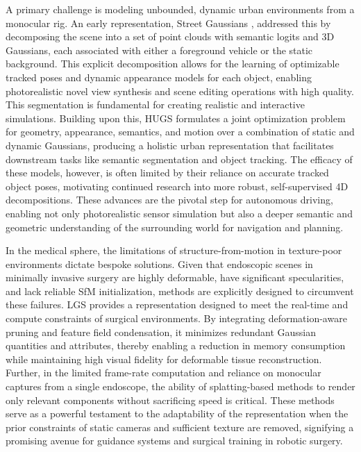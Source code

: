 \documentclass[11pt,a4paper]{article}
\begin{document}
A primary challenge is modeling unbounded, dynamic urban environments from a monocular rig. An early representation, Street Gaussians \cite{arxiv:2401.01339v1}, addressed this by decomposing the scene into a set of point clouds with semantic logits and 3D Gaussians, each associated with either a foreground vehicle or the static background. This explicit decomposition allows for the learning of optimizable tracked poses and dynamic appearance models for each object, enabling photorealistic novel view synthesis and scene editing operations with high quality. This segmentation is fundamental for creating realistic and interactive simulations. Building upon this, HUGS \cite{arxiv:2403.12722v1} formulates a joint optimization problem for geometry, appearance, semantics, and motion over a combination of static and dynamic Gaussians, producing a holistic urban representation that facilitates downstream tasks like semantic segmentation and object tracking. The efficacy of these models, however, is often limited by their reliance on accurate tracked object poses, motivating continued research into more robust, self-supervised 4D decompositions. These advances are the pivotal step for autonomous driving, enabling not only photorealistic sensor simulation but also a deeper
semantic and geometric understanding of the surrounding world for navigation and planning.

In the medical sphere, the limitations of structure-from-motion in texture-poor environments dictate bespoke solutions. Given that endoscopic scenes in minimally invasive surgery are highly deformable, have significant specularities, and lack reliable SfM initialization, methods are explicitly designed to circumvent these failures. LGS \cite{arxiv:2406.16073v1} provides a representation designed to meet the real-time and compute constraints of surgical environments. By integrating deformation-aware pruning and feature field condensation, it minimizes redundant Gaussian quantities and attributes, thereby enabling a reduction in memory consumption while maintaining high visual fidelity for deformable tissue reconstruction. Further, in the limited frame-rate computation and reliance on monocular captures from a single endoscope, the ability of splatting-based methods to render only relevant components without sacrificing speed is critical. These methods serve as a powerful testament to the adaptability of the representation when the prior constraints of static cameras and sufficient texture are removed, signifying a promising avenue for guidance systems and surgical training in robotic surgery.
\end{document}

